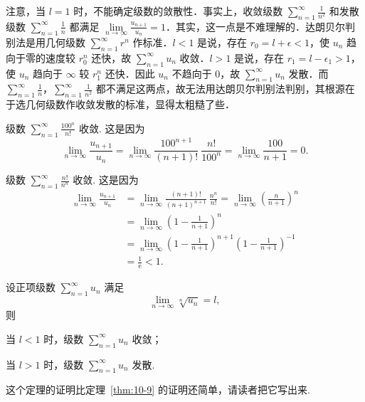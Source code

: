 注意，当 $l=1$ 时，不能确定级数的敛散性．事实上，收敛级数 $\sum_{n=1}^{\infty}\frac{1}{n^{2}}$ 和发散级数 $\sum_{n=1}^{\infty}\frac{1}{n}$ 都满足 $\lim\limits_{n\to\infty}\frac{u_{n+1}}{u_{n}}=1$．其实，这一点是不难理解的．达朗贝尔判别法是用几何级数 $\sum_{n=1}^{\infty}r^{n}$ 作标准．$l<1$ 是说，存在 $r_{0}=l+\epsilon<1$，使 $u_{n}$ 趋向于零的速度较 $r_{0}^{n}$ 还快，故 $\sum_{n=1}^{\infty}u_{n}$ 收敛．$l>1$ 是说，存在 $r_{1}=l-\epsilon_{1}>1$，使 $u_{n}$ 趋向于 $\infty$ 较 $r_{1}^{n}$ 还快．因此 $u_{n}$ 不趋向于 $0$，故 $\sum_{n=1}^{\infty}u_{n}$ 发散．而 $\sum_{n=1}^{\infty}\frac{1}{n}$，$\sum_{n=1}^{\infty}\frac{1}{n^{2}}$ 都不满足这两点，故无法用达朗贝尔判别法判别，其根源在于选几何级数作收敛发散的标准，显得太粗糙了些．

\begin{example}\label{ex:10-3-4}
级数 $\displaystyle\sum_{n=1}^{\infty}\frac{100^{n}}{n!}$ 收敛. 这是因为
\[
\lim_{n\to\infty}\frac{u_{n+1}}{u_{n}}=\lim_{n\to\infty}\frac{100^{n+1}}{(n+1)!}\ \frac{n!}{100^{n}}=\lim_{n\to\infty}\frac{100}{n+1}=0.
\]
\end{example}

\begin{example}\label{ex:10-3-5}
级数 $\displaystyle\sum_{n=1}^{\infty}\frac{n!}{n^{n}}$ 收敛. 这是因为
\[
\begin{aligned}
\lim_{n\to\infty}\frac{u_{n+1}}{u_{n}}&=\lim_{n\to\infty}\frac{(n+1)!}{(n+1)^{n+1}}\ \frac{n^{n}}{n!}=\lim_{n\to\infty}\left(\frac{n}{n+1}\right)^{n}\\
&=\lim_{n\to\infty}\left(1-\frac{1}{n+1}\right)^{n}\\
&=\lim_{n\to\infty}\left(1-\frac{1}{n+1}\right)^{n+1}\left(1-\frac{1}{n+1}\right)^{-1}\\
&=\frac{1}{\mathrm{e}}<1.
\end{aligned}
\]
\end{example}

\begin{theorem}[柯西判别法]\label{thm:10-10}
设正项级数 $\sum_{n=1}^{\infty}u_{n}$ 满足
\[
\lim_{n\to\infty}\sqrt[n]{u_{n}}=l,
\]
则
\begin{ziti}
\item 当 $l<1$ 时，级数 $\sum_{n=1}^{\infty}u_{n}$ 收敛；
\item 当 $l>1$ 时，级数 $\sum_{n=1}^{\infty}u_{n}$ 发散.
\end{ziti}
\end{theorem}

这个定理的证明比定理~\ref{thm:10-9} 的证明还简单，请读者把它写出来.

